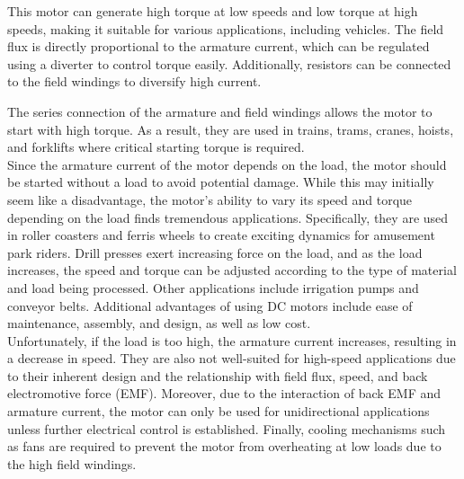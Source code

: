 \documentclass{article}
\begin{document}
\begin{flushleft}

This motor can generate high torque at low speeds and low torque at high speeds, making it suitable for various applications, including vehicles. The field flux is directly proportional to the armature current, which can be regulated using a diverter to control torque easily. Additionally, resistors can be connected to the field windings to diversify high current.

The series connection of the armature and field windings allows the motor to start with high torque. As a result, they are used in trains, trams, cranes, hoists, and forklifts where critical starting torque is required.
\newline
\\

Since the armature current of the motor depends on the load, the motor should be started without a load to avoid potential damage. While this may initially seem like a disadvantage, the motor's ability to vary its speed and torque depending on the load finds tremendous applications. Specifically, they are used in roller coasters and ferris wheels to create exciting dynamics for amusement park riders. Drill presses exert increasing force on the load, and as the load increases, the speed and torque can be adjusted according to the type of material and load being processed. Other applications include irrigation pumps and conveyor belts. Additional advantages of using DC motors include ease of maintenance, assembly, and design, as well as low cost.
\newline
\\
 Unfortunately, if the load is too high, the armature current increases, resulting in a decrease in speed. They are also not well-suited for high-speed applications due to their inherent design and the relationship with field flux, speed, and back electromotive force (EMF). Moreover, due to the interaction of back EMF and armature current, the motor can only be used for unidirectional applications unless further electrical control is established. Finally, cooling mechanisms such as fans are required to prevent the motor from overheating at low loads due to the high field windings.
\newline
 \vspace*{3pt}


\end{flushleft}
\end{document}
